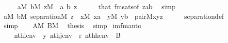 \begin{isabellebody}
\ \ \ \ \ {\isachardoublequoteopen}a{\isasymin}M{\isachardoublequoteclose}\ {\isachardoublequoteopen}b{\isasymin}M{\isachardoublequoteclose}\ {\isachardoublequoteopen}z{\isasymin}M{\isachardoublequoteclose}\ \ a\ b\ z\isanewline
\ \ \ \ \isamarkupfalse%
\ that\ fmsats{\isacharbrackleft}{\kern0pt}of\ {\isachardoublequoteopen}{\isacharbrackleft}{\kern0pt}z{\isacharcomma}{\kern0pt}a{\isacharcomma}{\kern0pt}b{\isacharbrackright}{\kern0pt}{\isachardoublequoteclose}{\isacharbrackright}{\kern0pt}\ \isamarkupfalse%
\ simp\isanewline
\ \ \isamarkupfalse%
\isanewline
\ \ \isamarkupfalse%
\ {\isachardoublequoteopen}{\isasymforall}a{\isasymin}M{\isachardot}{\kern0pt}\ {\isasymforall}b{\isasymin}M{\isachardot}{\kern0pt}\ separation{\isacharparenleft}{\kern0pt}{\isacharhash}{\kern0pt}{\isacharhash}{\kern0pt}M{\isacharcomma}{\kern0pt}\ {\isasymlambda}z\ {\isachardot}{\kern0pt}\ {\isacharparenleft}{\kern0pt}{\isasymexists}x{\isasymin}M{\isachardot}{\kern0pt}\ x{\isasymin}a\ {\isasymand}\ {\isacharparenleft}{\kern0pt}{\isasymexists}y{\isasymin}M{\isachardot}{\kern0pt}\ y{\isasymin}b\ {\isasymand}\ pair{\isacharparenleft}{\kern0pt}{\isacharhash}{\kern0pt}{\isacharhash}{\kern0pt}M{\isacharcomma}{\kern0pt}x{\isacharcomma}{\kern0pt}y{\isacharcomma}{\kern0pt}z{\isacharparenright}{\kern0pt}{\isacharparenright}{\kern0pt}{\isacharparenright}{\kern0pt}{\isacharparenright}{\kern0pt}{\isachardoublequoteclose}\isanewline
\ \ \ \ \isamarkupfalse%
\ separation{\isacharunderscore}{\kern0pt}def\ \isamarkupfalse%
\ simp\isanewline
\ \ \isamarkupfalse%
\ {\isacartoucheopen}A{\isasymin}M{\isacartoucheclose}\ {\isacartoucheopen}B{\isasymin}M{\isacartoucheclose}\ \isamarkupfalse%
\ {\isacharquery}{\kern0pt}thesis\ \isamarkupfalse%
\ simp\isanewline
{}\isamarkupfalse%
%
\endisatagproof
{\isafoldproof}%
%
\isadelimproof
\isanewline
%
\endisadelimproof
\isanewline
{}\isamarkupfalse%
\ im{\isacharunderscore}{\kern0pt}fm{\isacharunderscore}{\kern0pt}auto{\isacharcolon}{\kern0pt}\isanewline
\ \ \isanewline
\ \ \ \ {\isachardoublequoteopen}nth{\isacharparenleft}{\kern0pt}i{\isacharcomma}{\kern0pt}env{\isacharparenright}{\kern0pt}\ {\isacharequal}{\kern0pt}\ y{\isachardoublequoteclose}\ {\isachardoublequoteopen}nth{\isacharparenleft}{\kern0pt}j{\isacharcomma}{\kern0pt}env{\isacharparenright}{\kern0pt}\ {\isacharequal}{\kern0pt}\ r{\isachardoublequoteclose}\ {\isachardoublequoteopen}nth{\isacharparenleft}{\kern0pt}h{\isacharcomma}{\kern0pt}env{\isacharparenright}{\kern0pt}\ {\isacharequal}{\kern0pt}\ B{\isachardoublequoteclose}\isanewline

\end{isabellebody}
